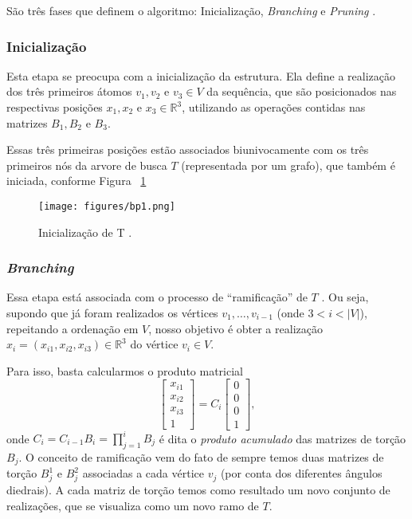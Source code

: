 São três fases que definem o algoritmo: Inicialização, \textit{Branching} e \textit{Pruning} \cite{fidalgotese}.

\subsubsection*{Inicialização}
Esta etapa se preocupa com a inicialização da estrutura. Ela define a realização dos três primeiros átomos $v_1, v_2$ e $v_3 \in V$ da sequência, que são posicionados nas respectivas posições $x_1, x_2$ e $x_3 \in \mathbb{R}^3$, utilizando as operações contidas nas matrizes $B_1, B_2$ e $B_3$. 

Essas três primeiras posições estão associados biunivocamente com os três primeiros nós da arvore de busca $T$ (representada por um grafo), que também é iniciada, conforme Figura ~\ref{fig:bp1}

\begin{figure}[H]
	\begin{center}
		\texttt{[image: figures/bp1.png]}
	\end{center}
	\caption{Inicialização de T \cite{fidalgotese}.}
	\label{fig:bp1}
\end{figure}

\subsubsection*{\textit{Branching}}
Essa etapa está associada com o processo de ``ramificação'' de $T$ \cite{fidalgotese}. Ou seja, supondo que já foram realizados os vértices $v_1, \dots, v_{i-1}$ (onde $3 < i< |V|$), repeitando a ordenação em $V$, nosso objetivo é obter a realização $x_i = (x_{i1}, x_{i2}, x_{i3}) \in \mathbb{R}^3$ do vértice $v_i \in V$.

Para isso, basta calcularmos o produto matricial
$$
\begin{bmatrix}
	x_{i1}\\ 
	x_{i2}\\ 
	x_{i3}\\ 
	1
\end{bmatrix}
= C_{i}\begin{bmatrix}
	0\\ 
	0\\ 
	0\\ 
	1
\end{bmatrix},
$$
onde $C_i = C_{i-1}B_i = \prod_{j=1}^{i}B_j$ é dita o \textit{produto acumulado} das matrizes de torção $B_j$. O conceito de ramificação vem do fato de sempre temos duas matrizes de torção $B_j^1$ e $B_j^2$ associadas a cada vértice $v_j$ (por conta dos diferentes ângulos diedrais). A cada matriz de torção temos como resultado um novo conjunto de realizações, que se visualiza como um novo ramo de $T$.

